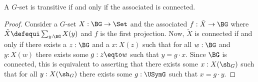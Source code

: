 \begin{lemma}
  \label{lem:conistrans}
  A $G$-set is transitive if and only if the associated \covering is connected.
\end{lemma}
\begin{proof}
  Consider a $G$-set $X:\BG\to\Set$ and the associated \covering
  $f:\tilde X\to\BG$ where $\tilde X\defequi\sum_{y:\BG}X(y)$ and $f$
  is the first projection.  Now, $\tilde X$ is connected if and only
  if there exists a $z:\BG$ and a $x:X(z)$ such that for
  all $w:\BG$ and $y:X(w)$ there exists some $g:z\eqto w$ such that $y=g\cdot x$.
  Since $\BG$ is connected, this is equivalent to asserting that there
  exists some $x:X(\sh_G)$ such that for all $y:X(\sh_G)$ there exists
  some $g:\USymG$ such that $x=g\cdot y$.
\end{proof}

